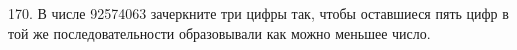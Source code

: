 170. В числе 92574063 зачеркните три цифры так, чтобы оставшиеся пять цифр в той же последовательности образовывали как можно меньшее число.\\
